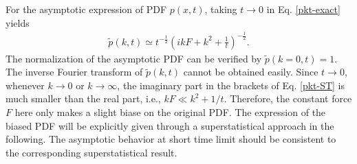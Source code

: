 \documentclass[aps,pre,twocolumn,groupedaddress,longbibliography]{revtex4-2}
\begin{document}
For the asymptotic expression of PDF $p(x,t)$, taking $t\rightarrow 0$ in Eq. \eqref{pkt-exact} yields
\begin{equation}\label{pkt-ST}
\begin{split}
\tilde{p}(k,t)\simeq t^{-\frac{1}{2}}\left(ikF+k^2+\frac{1}{t}\right)^{-\frac{1}{2}}.
\end{split}
\end{equation}
The normalization of the asymptotic PDF can be verified by $\tilde{p}(k=0,t)=1$. The inverse Fourier transform of $\tilde{p}(k,t)$ cannot be obtained easily. Since $t\rightarrow 0$, whenever $k\rightarrow0$ or $k\rightarrow\infty$, the imaginary part in the brackets of Eq. \eqref{pkt-ST} is much smaller than the real part, i.e., $kF\ll k^2+1/t$. Therefore, the constant force $F$ here only makes a slight biase on the original PDF. The expression of the biased PDF will be explicitly given through a superstatistical approach in the following. The asymptotic behavior at short time limit should be consistent to the corresponding superstatistical result.
\end{document}
